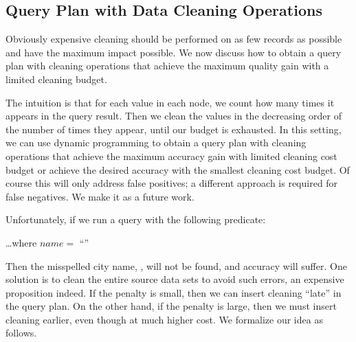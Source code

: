 



\subsection{Query Plan with Data Cleaning Operations}
\label{subsec:gain}

Obviously expensive cleaning should be performed on as few records as possible and have the maximum impact possible. We now discuss how to obtain a query plan with cleaning operations that achieve the maximum quality gain with a limited cleaning budget. 

The intuition is that for each value in each node, we count how many times it appears in the query result. Then we clean the values in the decreasing order of the number of times they appear, until our budget is exhausted.  In this setting, we can use dynamic programming to obtain a query plan with cleaning operations that achieve the maximum accuracy gain with limited cleaning cost budget or achieve the desired accuracy with the smallest cleaning cost budget. Of course this will only address false positives; a different approach is required for false negatives. We make it as a future work.



\iffalse %
Unfortunately, if we run a query with the following predicate:

\vspace{.5em}
\dots \textsf{where} $name = $ ``''
\vspace{.5em}

\noindent Then the misspelled city name,  \ie {}, will not be found, and accuracy will suffer. One solution is to clean the entire source data sets to avoid such errors, an expensive proposition indeed. If the penalty is small, then we can insert cleaning ``late'' in the query plan. On the other hand, if the penalty is large, then we must insert cleaning earlier, even though at much higher cost. We formalize our idea as follows.


